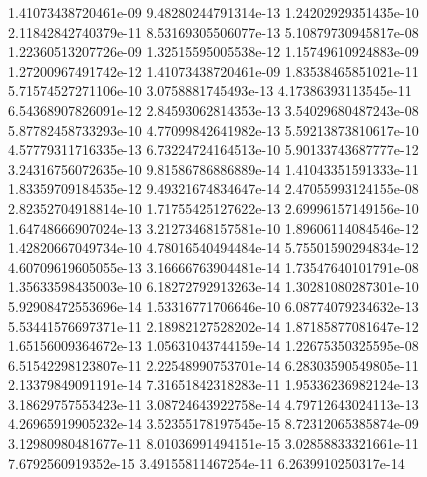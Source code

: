 1.41073438720461e-09	9.48280244791314e-13	1.24202929351435e-10	2.11842842740379e-11	8.53169305506077e-13	5.10879730945817e-08	1.22360513207726e-09	1.32515595005538e-12	1.15749610924883e-09	1.27200967491742e-12	1.41073438720461e-09	1.83538465851021e-11
5.71574527271106e-10	3.0758881745493e-13	4.17386393113545e-11	6.54368907826091e-12	2.84593062814353e-13	3.54029680487243e-08	5.87782458733293e-10	4.77099842641982e-13	5.59213873810617e-10	4.57779311716335e-13	6.73224724164513e-10	5.90133743687777e-12
3.24316756072635e-10	9.81586786886889e-14	1.41043351591333e-11	1.83359709184535e-12	9.49321674834647e-14	2.47055993124155e-08	2.82352704918814e-10	1.71755425127622e-13	2.69996157149156e-10	1.64748666907024e-13	3.21273468157581e-10	1.89606114084546e-12
1.42820667049734e-10	4.78016540494484e-14	5.75501590294834e-12	4.60709619605055e-13	3.16666763904481e-14	1.73547640101791e-08	1.35633598435003e-10	6.18272792913263e-14	1.30281080287301e-10	5.92908472553696e-14	1.53316771706646e-10	6.08774079234632e-13
5.53441576697371e-11	2.18982127528202e-14	1.87185877081647e-12	1.65156009364672e-13	1.05631043744159e-14	1.22675350325595e-08	6.51542298123807e-11	2.22548990753701e-14	6.28303590549805e-11	2.13379849091191e-14	7.31651842318283e-11	1.95336236982124e-13
3.18629757553423e-11	3.08724643922758e-14	4.79712643024113e-13	4.26965919905232e-14	3.52355178197545e-15	8.72312065385874e-09	3.12980980481677e-11	8.01036991494151e-15	3.02858833321661e-11	7.6792560919352e-15	3.49155811467254e-11	6.2639910250317e-14
